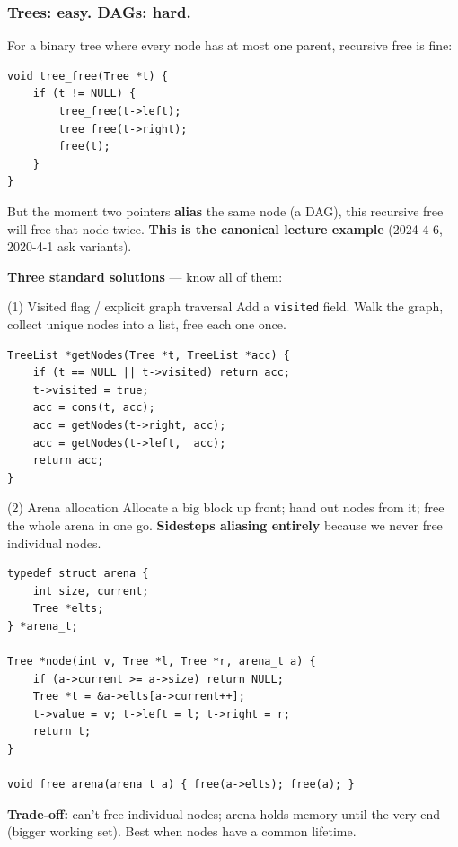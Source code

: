 \documentclass[11pt,a4paper]{article}
\begin{document}
\subsubsection*{Trees: easy. DAGs: hard.}

For a binary tree where every node has at most one parent, recursive free is fine:

\begin{lstlisting}
void tree_free(Tree *t) {
    if (t != NULL) {
        tree_free(t->left);
        tree_free(t->right);
        free(t);
    }
}
\end{lstlisting}

But the moment two pointers \textbf{alias} the same node (a DAG), this recursive free will free that node twice. \textbf{This is the canonical lecture example} (2024-4-6, 2020-4-1 ask variants).

\textbf{Three standard solutions} --- know all of them:

\begin{plain}{(1) Visited flag / explicit graph traversal}
Add a \texttt{visited} field. Walk the graph, collect unique nodes into a list, free each one once.
\begin{lstlisting}
TreeList *getNodes(Tree *t, TreeList *acc) {
    if (t == NULL || t->visited) return acc;
    t->visited = true;
    acc = cons(t, acc);
    acc = getNodes(t->right, acc);
    acc = getNodes(t->left,  acc);
    return acc;
}
\end{lstlisting}
\end{plain}

\begin{plain}{(2) Arena allocation}
Allocate a big block up front; hand out nodes from it; free the whole arena in one go. \textbf{Sidesteps aliasing entirely} because we never free individual nodes.

\begin{lstlisting}
typedef struct arena {
    int size, current;
    Tree *elts;
} *arena_t;

Tree *node(int v, Tree *l, Tree *r, arena_t a) {
    if (a->current >= a->size) return NULL;
    Tree *t = &a->elts[a->current++];
    t->value = v; t->left = l; t->right = r;
    return t;
}

void free_arena(arena_t a) { free(a->elts); free(a); }
\end{lstlisting}
\textbf{Trade-off:} can't free individual nodes; arena holds memory until the very end (bigger working set). Best when nodes have a common lifetime.
\end{plain}
\end{document}

